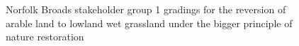 \documentclass[
  12pt,
  letterpaper,
  DIV=11,
  numbers=noendperiod]{scrartcl}
\begin{document}
\begin{figure}[H]


\caption{\label{fig-BroadsArBigG1}Norfolk Broads stakeholder group 1
gradings for the reversion of arable land to lowland wet grassland under
the bigger principle of nature restoration}

\end{figure}%
\end{document}
